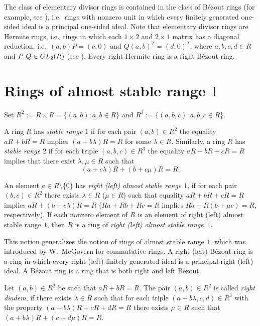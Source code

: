 \documentclass[10pt,a4paper]{amsart}
\def\GL{\rm GL}
\theoremstyle{plain}
\theoremstyle{definition}
\begin{document}
The class of elementary divisor rings is contained in the class of B\'ezout rings (for example, see \cite{7-kaplansky, Mon_Shchedryk, 12-zabavsky}),
i.e.~rings with nonzero unit in which every finitely generated one-sided ideal is a principal one-sided ideal.
Note that elementary divisor rings are Hermite rings, i.e.~rings in which each  $1\times 2$ and $2\times 1$ matrix   has a  diagonal reduction,
i.e.~$(a,b)P=(c,0)$ and \linebreak
$Q(a, b)^T=(d,0)^T$, where    $a, b, c, d\in R$ and   $P, Q\in \GL_2(R)$  (see \cite{7-kaplansky, 12-zabavsky}).  Every  right Hermite ring is a  right B\'ezout ring.


\section{Rings of almost stable range $1$}

Set
$R^2:=R\times R=\big\{(a,b) : a,b\in R\big\}$  and $R^3:=\big\{(a,b,c) : a,b,c\in R\big\}$.


A ring  $R$ has  {\it stable range $1$} if for each pair $(a,b)\in R^2$ the equality $aR+bR=R$ implies $(a+b\lambda)R=R$ for some $\lambda\in R$.
Similarly, a ring  $R$ has  {\it stable range $2$} if for each triple \linebreak
$(a,b,c)\in R^3$ the equality $aR+bR+cR=R$ implies that there  exist $\lambda,\mu\in R$ such that
\[
(a+c\lambda)R+(b+c\mu)R=R.
\]

An element  $a\in R\setminus\{0\}$ has  {\it   right (left) almost stable range $1$}, if for each pair $(b,c)\in R^2$  there exists $\lambda\in R$ ($\mu\in R$) such that  equality  $aR+bR+cR=R$  implies   $aR+(b+c\lambda)R=R$ ($Ra+Rb+Rc=R$ implies  $Ra+R(b+\mu c)=R$, respectively). If each nonzero element of $R$ is an element of right (left) almost stable range $1$, then $R$ is a ring of  {\it right (left) almost stable range~$1$}.

This notion generalizes the  notion of rings of almost stable range $1$, which was introduced by W.~McGovern for commutative rings.
 A right (left) B\'ezout ring  is a ring in which every right (left) finitely generated ideal is a principal right (left) ideal.  A B\'ezout ring is a ring that is both right and left B\'ezout.


Let $(a,b)\in R^2$ be such that  $aR+bR=R$. The pair $(a,b)\in R^2$ is called   {\it right diadem}, \linebreak
if there  exists  $\lambda\in R$ such that for each  triple $(a+b\lambda, c,d)\in R^3$ with the property  \linebreak
$(a+b\lambda)R+cR+dR=R$ there exists  $\mu\in R$ such that
$(a+b\lambda)R+(c+d\mu)R=R$.
\end{document}
